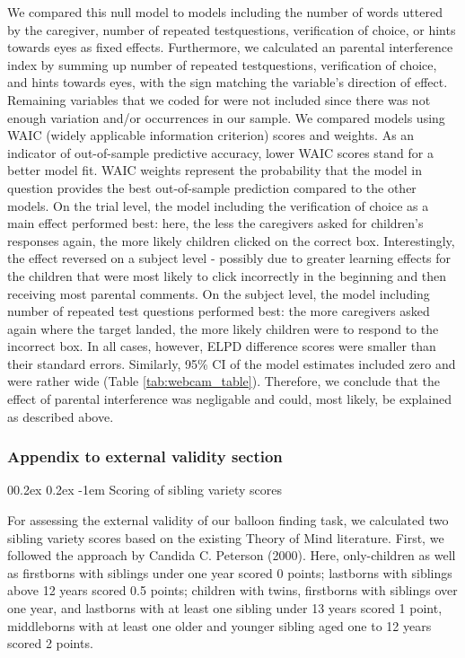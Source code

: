 \documentclass[
  man,floatsintext]{apa6}
\makeatletter
\let\oldparagraph\paragraph
\renewcommand{\paragraph}[1]{\oldparagraph{#1}\mbox{}}
\renewcommand{\paragraph}{\@startsection{paragraph}{4}{\parindent}%
  {0\baselineskip \@plus 0.2ex \@minus 0.2ex}%
  {-1em}%
  {\normalfont\normalsize\bfseries\itshape\typesectitle}}
\makeatother
\begin{document}
We compared this null model to models including the number of words uttered by the caregiver, number of repeated testquestions, verification of choice, or hints towards eyes as fixed effects. Furthermore, we calculated an parental interference index by summing up number of repeated testquestions, verification of choice, and hints towards eyes, with the sign matching the variable's direction of effect. Remaining variables that we coded for were not included since there was not enough variation and/or occurrences in our sample.
We compared models using WAIC (widely applicable information criterion) scores and weights. As an indicator of out-of-sample predictive accuracy, lower WAIC scores stand for a better model fit. WAIC weights represent the probability that the model in question provides the best out-of-sample prediction compared to the other models.
On the trial level, the model including the verification of choice as a main effect performed best: here, the less the caregivers asked for children's responses again, the more likely children clicked on the correct box. Interestingly, the effect reversed on a subject level - possibly due to greater learning effects for the children that were most likely to click incorrectly in the beginning and then receiving most parental comments. On the subject level, the model including number of repeated test questions performed best: the more caregivers asked again where the target landed, the more likely children were to respond to the incorrect box. In all cases, however, ELPD difference scores were smaller than their standard errors. Similarly, 95\% CI of the model estimates included zero and were rather wide (Table \ref{tab:webcam_table}). Therefore, we conclude that the effect of parental interference was negligable and could, most likely, be explained as described above.

\hypertarget{appendix-to-external-validity-section}{%
\subsubsection{Appendix to external validity section}\label{appendix-to-external-validity-section}}

\hypertarget{scoring-of-sibling-variety-scores}{%
\paragraph{Scoring of sibling variety scores}\label{scoring-of-sibling-variety-scores}}

For assessing the external validity of our balloon finding task, we calculated two sibling variety scores based on the existing Theory of Mind literature.
First, we followed the approach by Candida C. Peterson (2000). Here, only-children as well as firstborns with siblings under one year scored 0 points; lastborns with siblings above 12 years scored 0.5 points; children with twins, firstborns with siblings over one year, and lastborns with at least one sibling under 13 years scored 1 point, middleborns with at least one older and younger sibling aged one to 12 years scored 2 points.
\end{document}
